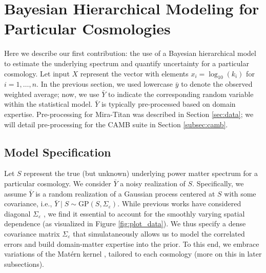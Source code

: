 \documentclass[11pt]{article}
\begin{document}

\section{Bayesian Hierarchical Modeling for Particular Cosmologies}
\label{sec:hm_fit}

Here we describe our first contribution: the use of a Bayesian hierarchical model 
to estimate the underlying spectrum and quantify uncertainty for a particular cosmology.
Let input $X$ represent the vector with elements $x_i = \log_{10}(k_i)$ for $i=1,\dots,n$.
In the previous section, we used lowercase $\bar{y}$ to denote 
the observed weighted average; now, we use $\bar{Y}$ to indicate the corresponding 
random variable within the statistical model.  
$\bar{Y}$ is typically pre-processed
based on domain expertise.  Pre-processing for Mira-Titan was described in Section 
\ref{sec:data}; we will detail pre-processing 
for the CAMB suite in Section \ref{subsec:camb}.

\subsection{Model Specification}
\label{sec:mod_spec}

Let $S$ represent the true (but unknown) underlying power matter spectrum for
a particular cosmology.  We consider $\bar{Y}$ a noisy realization of $S$.
Specifically, we assume $\bar{Y}$ is a random realization of a Gaussian 
process centered at $S$ with some covariance, i.e., 
$\bar{Y}\mid S \sim \mathrm{GP}(S, \Sigma_\varepsilon)$.  While previous works
have considered diagonal $\Sigma_\varepsilon$ \citep{moran2023mira}, we find it
essential to account for the smoothly varying spatial dependence
(as visualized in Figure \ref{fig:plot_data}).  We thus specify a dense 
covariance matrix $\Sigma_\varepsilon$ that simulataneously
allows us to model the correlated errors and build domain-matter expertise
into the prior. To this end, we embrace variations of the Mat\'ern kernel 
\citep{stein1999interpolation}, tailored to each cosmology (more on this in later 
subsections). 
\end{document}
